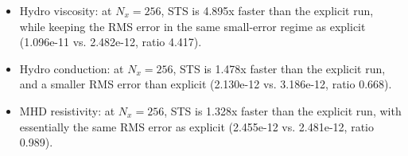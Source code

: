 \begin{itemize}
\item Hydro viscosity: at $N_x=256$, STS is 4.895x faster than the explicit run, while keeping the RMS error in the same small-error regime as explicit (1.096e-11 vs. 2.482e-12, ratio 4.417).
\item Hydro conduction: at $N_x=256$, STS is 1.478x faster than the explicit run, and a smaller RMS error than explicit (2.130e-12 vs. 3.186e-12, ratio 0.668).
\item MHD resistivity: at $N_x=256$, STS is 1.328x faster than the explicit run, with essentially the same RMS error as explicit (2.455e-12 vs. 2.481e-12, ratio 0.989).
\end{itemize}
